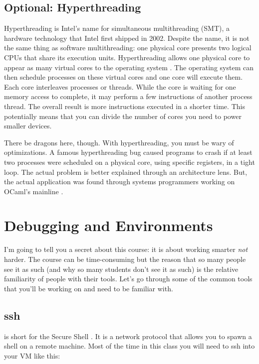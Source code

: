 \subsection{Optional: Hyperthreading}

Hyperthreading is Intel's name for simultaneous multithreading (SMT), a hardware technology that Intel first shipped in 2002.
Despite the name, it is not the same thing as software multithreading: one physical core presents two logical CPUs that share its execution units.
Hyperthreading allows one physical core to appear as many virtual cores to the operating system \cite[P.51]{guide2011intel}.
The operating system can then schedule processes on these virtual cores and one core will execute them.
Each core interleaves processes or threads.
While the core is waiting for one memory access to complete, it may perform a few instructions of another process thread.
The overall result is more instructions executed in a shorter time.
This potentially means that you can divide the number of cores you need to power smaller devices.

There be dragons here, though.
With hyperthreading, you must be wary of optimizations.
A famous hyperthreading bug caused programs to crash if at least two processes were scheduled on a physical core, using specific registers, in a tight loop.
The actual problem is better explained through an architecture lens.
But, the actual application was found through systems programmers working on OCaml's mainline \cite{leroy_2017}.

\section{Debugging and Environments}

I'm going to tell you a secret about this course: it is about working smarter \textit{not} harder.
The course can be time-consuming but the reason that so many people see it as such (and why so many students don't see it as such) is the relative familiarity of people with their tools.
Let's go through some of the common tools that you'll be working on and need to be familiar with.

\subsection{ssh}

 is short for the Secure Shell \cite{openbsd_ssh}.
It is a network protocol that allows you to spawn a shell on a remote machine.
Most of the time in this class you will need to ssh into your VM like this:

